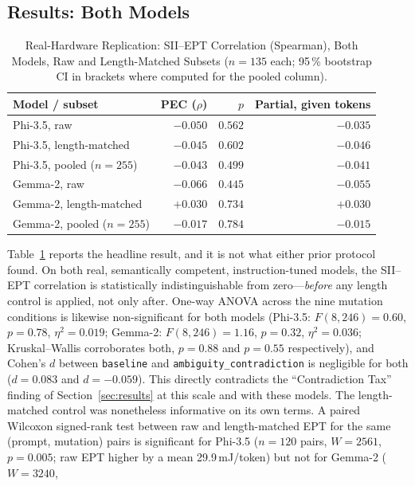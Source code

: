 \documentclass[conference]{IEEEtran}
\begin{document}
\subsection{Results: Both Models}
\label{sec:real-results}
\begin{table}[t]
\caption{Real-Hardware Replication: SII--EPT Correlation (Spearman),
Both Models, Raw and Length-Matched Subsets ($n=135$ each; 95\,\%
bootstrap CI in brackets where computed for the pooled column).}
\label{tab:real-pec}
\centering
\setlength{\tabcolsep}{3.2pt}
\begin{tabular}{@{}lrrr@{}}
\toprule
\textbf{Model / subset} & \textbf{PEC ($\rho$)} & \textbf{$p$} & \textbf{Partial, given tokens} \\
\midrule
Phi-3.5, raw            & $-0.050$ & $0.562$ & $-0.035$ \\
Phi-3.5, length-matched & $-0.045$ & $0.602$ & $-0.046$ \\
Phi-3.5, pooled ($n=255$) & $-0.043$ & $0.499$ & $-0.041$ \\
Gemma-2, raw            & $-0.066$ & $0.445$ & $-0.055$ \\
Gemma-2, length-matched & $+0.030$ & $0.734$ & $+0.030$ \\
Gemma-2, pooled ($n=255$) & $-0.017$ & $0.784$ & $-0.015$ \\
\bottomrule
\end{tabular}
\end{table}
Table~\ref{tab:real-pec} reports the headline result, and it is not
what either prior protocol found. On both real, semantically
competent, instruction-tuned models, the SII--EPT correlation is
statistically indistinguishable from zero---\emph{before} any length
control is applied, not only after. One-way ANOVA across the nine
mutation conditions is likewise non-significant for both models
(Phi-3.5: $F(8,246)=0.60$, $p=0.78$, $\eta^2=0.019$; Gemma-2:
$F(8,246)=1.16$, $p=0.32$, $\eta^2=0.036$; Kruskal--Wallis
corroborates both, $p=0.88$ and $p=0.55$ respectively), and Cohen's
$d$ between \texttt{baseline} and \texttt{ambiguity\_contradiction}
is negligible for both ($d=0.083$ and $d=-0.059$). This directly
contradicts the ``Contradiction Tax'' finding of
Section~\ref{sec:results} at this scale and with these models.
The length-matched control was nonetheless informative on its own
terms. A paired Wilcoxon signed-rank test between raw and
length-matched EPT for the same (prompt, mutation) pairs is
significant for Phi-3.5 ($n=120$ pairs, $W=2561$, $p=0.005$; raw EPT
higher by a mean 29.9\,mJ/token) but not for Gemma-2 ($W=3240$,
\end{document}
